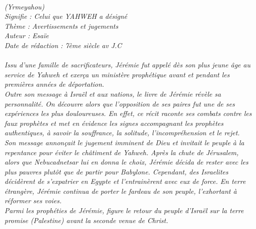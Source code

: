 \BFont
\noindent\hrulefill
{\footnotesize
\textit{
\bigskip
{\centering{}
\\(Yrmeyahou)
\\Signifie : Celui que YAHWEH a désigné
\\Thème : Avertissements et jugements
\\Auteur : Esaïe
\\Date de rédaction : 7ème siècle av J.C\\}
}
\textit{
\\Issu d’une famille de sacrificateurs, Jérémie fut appelé dès son plus jeune âge au service de Yahweh et exerça un ministère prophétique avant et pendant les premières années de déportation.
\\Outre son message à Israël et aux nations, le livre de Jérémie révèle sa personnalité. On découvre alors que l’opposition de ses paires fut une de ses expériences les plus douloureuses. En effet, ce récit raconte ses combats contre les faux prophètes et met en évidence les signes accompagnant les prophètes authentiques, à savoir la souffrance, la solitude, l’incompréhension et le rejet. 
\\Son message annonçait le jugement imminent de Dieu et invitait le peuple à la repentance pour éviter le châtiment de Yahweh. Après la chute de Jérusalem, alors que Nebucadnetsar lui en donna le choix, Jérémie décida de rester avec les plus pauvres plutôt que de partir pour Babylone. Cependant, des Israelites décidèrent de s’expatrier en Egypte et l’entrainèrent avec eux de force. En terre étrangère, Jérémie continua de porter le fardeau de son peuple, l’exhortant à réformer ses voies.
\\Parmi les prophéties de Jérémie, figure le retour du peuple d’Israël sur la terre promise (Palestine) avant la seconde venue de Christ.\bigskip
}
}
\par\nobreak\noindent\hrulefill
